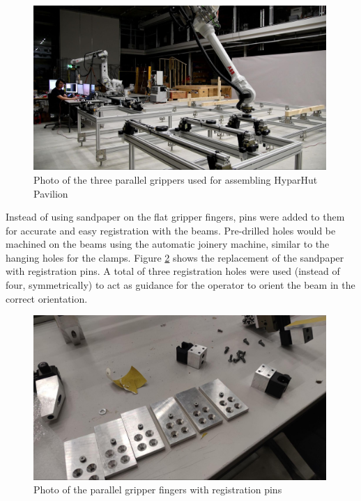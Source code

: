 \begin{figure}[!h]
    \centering
    \includegraphics[width=0.99\textwidth]{images/7a/img57.jpg}
    \caption{Photo of the three parallel grippers used for assembling HyparHut Pavilion}
    \label{fig:three-parallel-grippers}
\end{figure}

Instead of using sandpaper on the flat gripper fingers, pins were added to them for accurate and easy registration with the beams. Pre-drilled holes would be machined on the beams using the automatic joinery machine, similar to the hanging holes for the clamps. Figure \ref{fig:finger-with-registration-pins} shows the replacement of the sandpaper with registration pins. A total of three registration holes were used (instead of four, symmetrically) to act as guidance for the operator to orient the beam in the correct orientation. 

\begin{figure}[!h]
    \centering
    \includegraphics[width=0.99\textwidth]{images/7a/img58.jpg}
    \caption{Photo of the parallel gripper fingers with registration pins}
    \label{fig:finger-with-registration-pins}
\end{figure}


